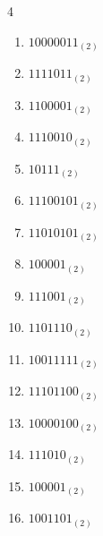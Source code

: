 \begin{multicols}{4}
\begin{enumerate}
        \phantom{$=183$}

  \item $10000011_{(2)}$

        \phantom{$=131$}

\columnbreak %

  \item $1111011_{(2)}$

        \phantom{$=123$}

  \item $1100001_{(2)}$

        \phantom{$=97$}

  \item $1110010_{(2)}$

        \phantom{$=114$}

  \item $10111_{(2)}$

        \phantom{$=23$}

  \item $11100101_{(2)}$

        \phantom{$=229$}

  \item $11010101_{(2)}$

        \phantom{$=213$}

  \item $100001_{(2)}$

        \phantom{$=33$}

  \item $111001_{(2)}$

        \phantom{$=57$}

  \item $1101110_{(2)}$

        \phantom{$=110$}

  \item $10011111_{(2)}$

        \phantom{$=159$}

  \item $11101100_{(2)}$

        \phantom{$=236$}

  \item $10000100_{(2)}$

        \phantom{$=132$}

  \item $111010_{(2)}$

        \phantom{$=58$}

  \item $100001_{(2)}$

        \phantom{$=33$}

  \item $1001101_{(2)}$

        \phantom{$=77$}

\end{enumerate}
\end{multicols}

